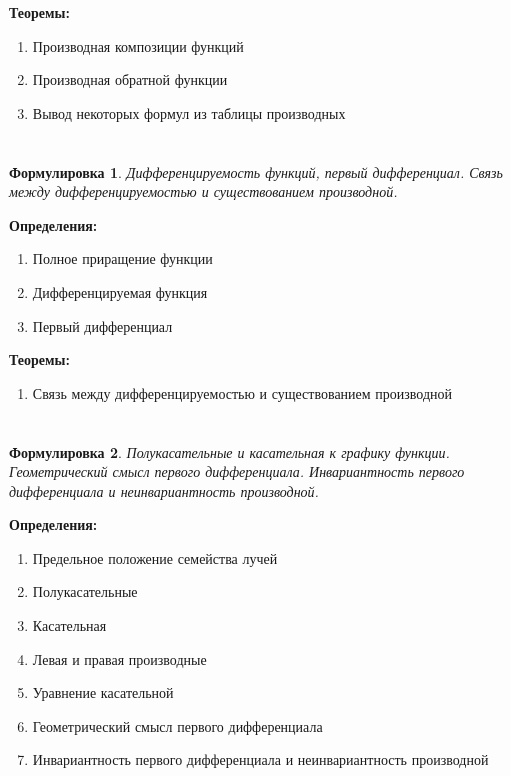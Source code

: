 \documentclass[a4paper]{article}
\theoremstyle{plain}
\newtheorem*{st}{Формулировка}
\theoremstyle{definition}
\theoremstyle{remark}
\begin{document}
\textbf{Теоремы:}
\begin{enumerate}
    \item Производная композиции функций
    \item Производная обратной функции
    \item Вывод некоторых формул из таблицы производных
\end{enumerate}


\section{}
\begin{st}
    Дифференцируемость функций, первый дифференциал. Связь между дифференцируемостью и существованием производной.
\end{st}

\textbf{Определения:}
\begin{enumerate}
    \item Полное приращение функции
    \item Дифференцируемая функция
    \item Первый дифференциал
\end{enumerate}

\textbf{Теоремы:}
\begin{enumerate}
    \item Связь между дифференцируемостью и существованием производной
\end{enumerate}


\section{}
\begin{st}
    Полукасательные и касательная к графику функции. Геометрический смысл первого дифференциала. Инвариантность первого дифференциала и неинвариантность производной.
\end{st}

\textbf{Определения:}
\begin{enumerate}
    \item Предельное положение семейства лучей
    \item Полукасательные
    \item Касательная
    \item Левая и правая производные
    \item Уравнение касательной
    \item Геометрический смысл первого дифференциала
    \item Инвариантность первого дифференциала и неинвариантность производной
\end{enumerate}
\end{document}
